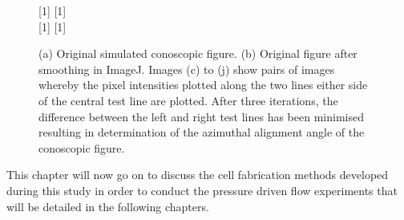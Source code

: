 \begin{figure}
\begin{center}
\scalebox{0.9}[1]{}
\scalebox{0.9}[1]{}\\
\scalebox{0.9}[1]{}
\scalebox{0.9}[1]{}
\end{center}
\caption[Automated conoscopic figure tracking routine]{\label{fig:figure_rotation1}(a) Original simulated conoscopic figure. (b) Original figure after smoothing in ImageJ. Images (c) to (j) show pairs of images whereby the pixel intensities plotted along the two lines either side of the central test line are plotted. After three iterations, the difference between the left and right test lines has been minimised resulting in determination of the azimuthal alignment angle of the conoscopic figure.}
\end{figure}

This chapter will now go on to discuss the cell fabrication methods developed during this study in order to conduct the pressure driven flow experiments that will be detailed in the following chapters.

